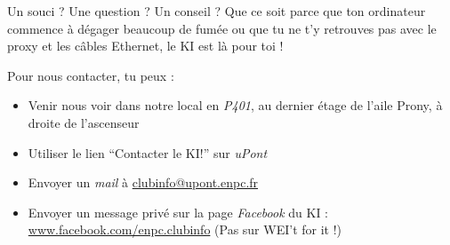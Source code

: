 \documentclass{../templates/enpc-ki/ki019}
\begin{document}
  \vspace{2cm}

    Un souci ? Une question ? Un conseil ? Que ce soit parce que ton ordinateur commence à dégager beaucoup de fumée ou que tu ne t’y retrouves pas avec le proxy et les câbles Ethernet, le KI est là pour toi !

    Pour nous contacter, tu peux :
\begin{itemize}
  \item Venir nous voir dans notre local en \emph{P401}, au dernier étage de l’aile Prony, à droite de l’ascenseur
  \item Utiliser le lien “Contacter le KI!” sur \emph{uPont}
  \item Envoyer un \emph{mail} à \href{mailto:clubinfo@upont.enpc.fr}{clubinfo@upont.enpc.fr}
  \item Envoyer un message privé sur la page \emph{Facebook} du KI : \\ \href{www.facebook.com/enpc.clubinfo}{www.facebook.com/enpc.clubinfo} (Pas sur WEI’t for it !)
\end{itemize}
\end{document}
